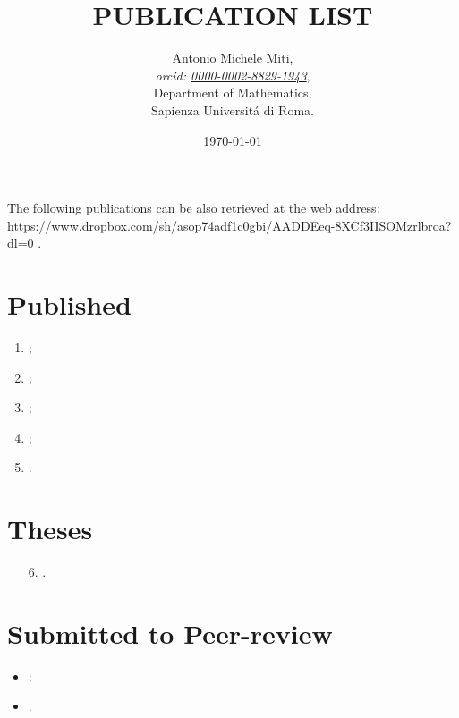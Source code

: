 \documentclass[a4paper]{article}
\title{PUBLICATION LIST}
\date{\today}
\author{
	Antonio Michele Miti,\\
	\emph{orcid: \href{https://orcid.org/0000-0002-8829-1943}{0000-0002-8829-1943}},
	\\
	Department of Mathematics,\\
	Sapienza Universit\'a di Roma.
}
\begin{document}
  

	\maketitle

	\noindent
  The following publications can be also retrieved at the web address:
  \\ 
  \url{https://www.dropbox.com/sh/asop74adf1c0gbi/AADDEeq-8XCf3IISOMzrlbroa?dl=0}
  .
  \nocite{*}


  \section*{Published}
	  \begin{enumerate}
 	   \item {};	  
	   \item {};		
 	   \item {};
 	   \item {};
 	   \item {}.
	  \end{enumerate}

  \section*{Theses}
	  \begin{itemize}
 	   \item[6.] .
	  \end{itemize}



  \section*{Submitted to Peer-review}
	  \begin{itemize}
		\item {}:
	   	\item {}.
	  \end{itemize}
\end{document}
